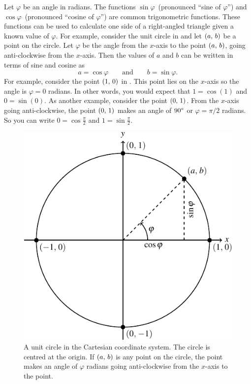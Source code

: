\documentclass[a4paper,oneside,12pt]{article}
\begin{document}
Let $\varphi$ be an angle in radians.  The functions
$\sin\varphi$~(pronounced ``sine of $\varphi$'') and
$\cos\varphi$~(pronounced ``cosine of $\varphi$'') are common
trigonometric functions.  These functions can be used to calculate one
side of a right-angled triangle given a known value of $\varphi$.  For
example, consider the unit circle in 
and let $\left\lparen{a},\, {b}\right\rparen$ be a point on the circle.  Let $\varphi$ be the
angle from the $x$-axis to the point $\left\lparen{a},\, {b}\right\rparen$, going
anti-clockwise from the $x$-axis.  Then the values of $a$ and $b$ can
be written in terms of sine and cosine as
\[
a = \cos\varphi
\qquad\text{and}\qquad
b = \sin\varphi.
\]
For example, consider the point $\left\lparen{1},\, {0}\right\rparen$ in
.  This point lies on the $x$-axis so
the angle is $\varphi = 0$ radians.  In other words, you would expect
that $1 = \cos(1)$ and $0 = \sin(0)$.  As another example, consider
the point $\left\lparen{0},\, {1}\right\rparen$.  From the $x$-axis going anti-clockwise, the
point $\left\lparen{0},\, {1}\right\rparen$ makes an angle of ${90}^{\circ}$ or
$\varphi = \pi / 2$ radians.  So you can write $0 = \cos\frac{\pi}{2}$
and $1 = \sin\frac{\pi}{2}$.

\begin{figure}[!htbp]
\centering
\includegraphics[scale=1.1]{image/04/unit-circle.pdf}
\caption{%
  A unit circle in the Cartesian coordinate system.  The circle is
  centred at the origin.  If $\left\lparen{a},\, {b}\right\rparen$ is any point on the
  circle, the point makes an angle of $\varphi$ radians going
  anti-clockwise from the $x$-axis to the point.
}
\label{fig:point_on_unit_circle}
\end{figure}
\end{document}
